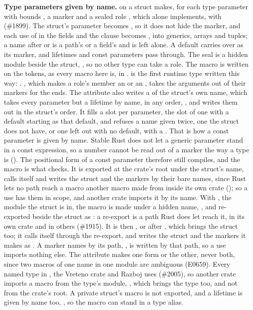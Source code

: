 \textbf{Type parameters given by name.}
 on a struct makes, for each type
parameter  with bounds , a marker
 and a sealed role
, which  alone
implements, with  (\#1899).
The struct's parameter becomes , so it does not
hide the marker, and each use of  in the fields and the
 clause becomes , into
generics, arrays and tuples; a name after \code{::} or  is a
path's or a field's and is left alone.
A default carries over as its marker, and lifetimes and const
parameters pass through.
The seal is a hidden module beside the struct, ,
so no other type can take a role.
The macro is written on the tokens, as every macro here is, in
.
 is the first runtime type written this way:
.
, which makes a role's  member an
 or an , takes the arguments out of their markers
for the ends.
The attribute also writes a  of the struct's own
name, which takes every parameter but a lifetime by name, in any order,
, and writes them out in the
struct's order.
It fills a slot per parameter, the slot of one with a default starting
as that default, and refuses a name given twice, one the struct does
not have, or one left out with no default, with a
.
That is how a const parameter is given by name.
Stable Rust does not let a generic parameter stand in a const
expression, so a number cannot be read out of a marker the way a type
is ().
The positional form of a const parameter therefore still compiles, and
the macro is what checks.
It is exported at the crate's root under the struct's name, calls
itself and writes the struct and the markers by their bare names, since
Rust lets no path reach a macro another macro made from inside its own
crate (); so a use has them in scope, and
another crate imports it by its name.
With , the module the struct is in, the macro is
made under a hidden name, , and re-exported
beside the struct as : a re-export is a path Rust does let
reach it, in its own crate and in others (\#1915).
It is then , or  after
, which brings the struct too; it calls
itself through the re-export, and writes the struct and the markers it
makes as .
A marker  names by its path,
, is written by that path, so a
use imports nothing else.
The attribute makes one form or the other, never both, since two
macros of one name in one module are ambiguous (E0659). Every named
type in , the Vreteno crate and Razboj uses
 (\#2005), so another crate imports a macro from the type's
module, , which brings the type
too, and not from the crate's root.
A private struct's macro is not exported, and a lifetime is given by
name too, , so the macro can stand in a type alias.

